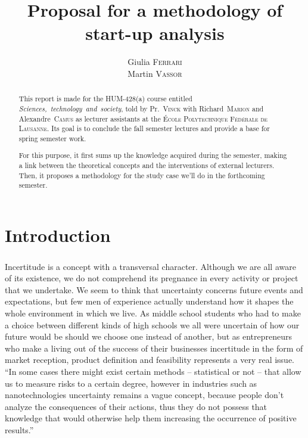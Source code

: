 \documentclass[twoside]{report}
\title{Proposal for a methodology of start-up analysis}
\author{Giulia \textsc{Ferrari}\\Martin \textsc{Vassor}}
\begin{document}
\maketitle
\begin{abstract}
	\paragraph{}
	This report is made for the HUM-428(a) course entitled \emph{Sciences,~technology~and~society}, told by Pr.~\textsc{Vinck} with Richard~\textsc{Marion} and Alexandre~\textsc{Camus} as lecturer assistants at the \textsc{École Polytechnique Fédérale de Lausanne}. Its goal is to conclude the fall semester lectures and provide a base for spring semester work. 

	For this purpose, it first sums up the knowledge acquired during the semester, making a link between the theoretical concepts and the interventions of external lecturers. Then, it proposes a methodology for the study case we'll do in the forthcoming semester.
\end{abstract}
\tableofcontents
\chapter*{Introduction}
\paragraph{}
Incertitude is a concept with a transversal character. Although we are all aware of its existence, we do not comprehend its pregnance in every activity or project that we undertake. We seem to think that uncertainty concerns future events and expectations, but few men of experience actually understand how it shapes the whole environment in which we live. As middle school students who had to make a choice between different kinds of high schools we all were uncertain of how our future would be should we choose one instead of another, but as entrepreneurs who make a living out of the success of their businesses incertitude in the form of market reception, product definition and feasibility represents a very real issue. \enquote{In some cases there might exist certain methods – statistical or not – that allow us to measure risks to a certain degree, however in industries such as nanotechnologies uncertainty remains a vague concept, because people don’t analyze the consequences of their actions, thus they do not possess that knowledge that would otherwise help them increasing the occurrence of positive results.}\cite{chalas_comment_2009}
\end{document}
